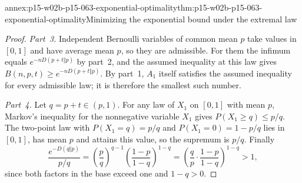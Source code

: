 \begin{annexitem}{annex:p15-w02b-p15-063-exponential-optimality}{thm:p15-w02b-p15-063-exponential-optimality}{Minimizing the exponential bound under the extremal law}
\begin{proof}
\emph{Part~3.} Independent Bernoulli variables of common mean \(p\) take
values in \([0,1]\) and have average mean \(p\), so they are admissible.
For them the infimum equals \(e^{-nD(p+t\Vert p)}\) by part~2, and the
assumed inequality at this law gives \(B(n,p,t)\geq e^{-nD(p+t\Vert p)}\).
By part~1, \(A_1\) itself satisfies the assumed inequality for every
admissible law; it is therefore the smallest such number.

\emph{Part~4.} Let \(q=p+t\in(p,1)\). For any law of \(X_1\) on \([0,1]\)
with mean \(p\), Markov's inequality for the nonnegative variable \(X_1\)
gives \(P(X_1\geq q)\leq p/q\). The two-point law with
\(P(X_1=q)=p/q\) and \(P(X_1=0)=1-p/q\) lies in \([0,1]\), has mean \(p\)
and attains this value, so the supremum is \(p/q\). Finally
\[
 \frac{e^{-D(q\Vert p)}}{p/q}
  =\left(\frac pq\right)^{q-1}\left(\frac{1-p}{1-q}\right)^{1-q}
  =\left(\frac qp\cdot\frac{1-p}{1-q}\right)^{1-q}>1,
\]
since both factors in the base exceed one and \(1-q>0\).
\end{proof}
\end{annexitem}

